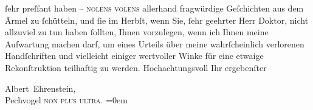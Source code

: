                ſehr {\pb}preſſant haben – \textsc{nolens volens} allerhand fragwürdige Geſchichten aus dem
               Ärmel zu ſchütteln, und ſie im Herbſt, wenn Sie, ſehr geehrter Herr Doktor, nicht
               allzuviel zu tun haben ſollten, Ihnen vorzulegen, wenn ich Ihnen meine Aufwartung
               machen darf, um eines Urteils über meine wahrſcheinlich verlorenen Handſchriften und
               vielleicht einiger wertvoller Winke für eine etwaige Rekonſtruktion teilhaftig zu
               werden. Hochachtungsvoll Ihr ergebenſter\pend
           
\pstart
           \spacefill\mbox{Albert Ehrenstein,}{\\[\baselineskip]}Pechvogel \textsc{non plus ultra.}\pend
           \leftskip=0em{}\endnumbering{}  
      